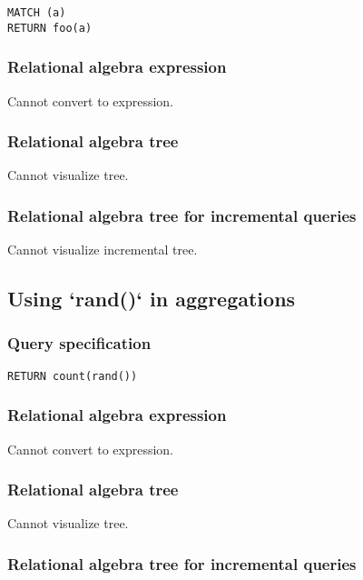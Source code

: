 \begin{lstlisting}
MATCH (a)
RETURN foo(a)
\end{lstlisting}

\subsubsection*{Relational algebra expression}

Cannot convert to expression.

\subsubsection*{Relational algebra tree}

Cannot visualize tree.

\subsubsection*{Relational algebra tree for incremental queries}

Cannot visualize incremental tree.

\subsection{Using `rand()` in aggregations}

\subsubsection*{Query specification}

\begin{lstlisting}
RETURN count(rand())
\end{lstlisting}

\subsubsection*{Relational algebra expression}

Cannot convert to expression.

\subsubsection*{Relational algebra tree}

Cannot visualize tree.

\subsubsection*{Relational algebra tree for incremental queries}


